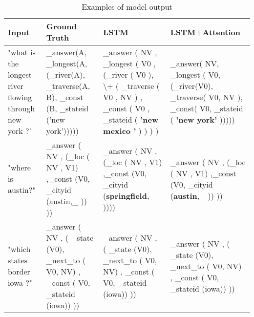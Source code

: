 \documentclass[11pt,a4paper]{article}
\begin{document}
\begin{table*}[t]
  \centering
  \begin{tabularx}{\textwidth}{|X|X|X|X|}
	\hline  
	\textbf{Input} & \textbf{Ground Truth} & \textbf{LSTM} & \textbf{LSTM+Attention} \\  
	\hline
	"what is the longest river flowing through new york ?" & 
	\_answer(A, \_longest(A, (\_river(A), \_traverse(A, B), \_const (B, \_stateid ('new york'))))) 
	& 
	\_answer ( NV , \_longest ( V0 , (\_river ( V0 ), \textbackslash + ( \_traverse ( V0 , NV ) , \_const ( V0 , \_stateid ( \textbf{'new mexico '} ) ) ) ) 
	&
	\_answer( NV, \_longest ( V0, (\_river(V0), \_traverse( V0, NV ), \_const( V0, \_stateid ( \textbf{'new york'} )))))	
	 \\ \hline
	"where is austin?" & 
	\_answer ( NV , (\_loc ( NV , V1) ,\_const (V0, \_cityid (austin,\_ )) ))
	& 
	\_answer ( NV , (\_loc ( NV , V1) ,\_const (V0, \_cityid (\textbf{springfield},\_ ))))
	
	&
		\_answer ( NV , (\_loc ( NV , V1) ,\_const (V0, \_cityid (\textbf{austin},\_ )) ))

	\\ \hline
	"which states border iowa ?" &
	\_answer ( NV , ( \_state (V0), \_next\_to ( V0, NV) , \_const ( V0, \_stateid (iowa)) )) &\_answer ( NV , ( \_state (V0), \_next\_to ( V0, NV) , \_const ( V0, \_stateid (iowa)) ))
	
	&\_answer ( NV , ( \_state (V0), \_next\_to ( V0, NV) , \_const ( V0, \_stateid (iowa)) ))
	
	
	\\ \hline
		
  \end{tabularx}
  \caption{\label{example}Examples of model output}
\end{table*}
\end{document}
